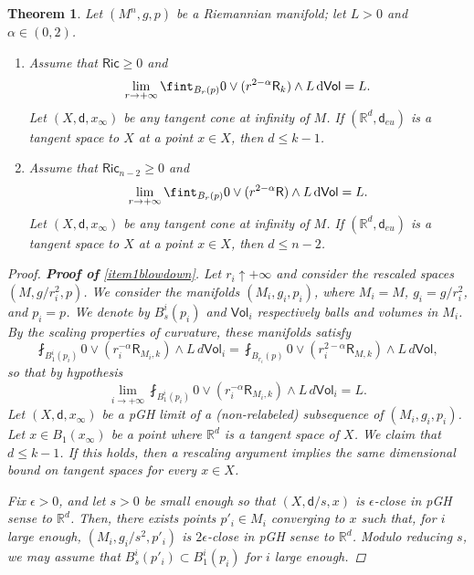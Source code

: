 \documentclass[10pt]{article}
\newtheorem{thm}{Theorem}[section]
\theoremstyle{definition}
\newcommand{\bb}[1]{\mathbb{#1}}
\newcommand{\ssf}[1]{\mathsf{#1}}
\newcommand{\Ric}{\mathsf{Ric}}
\newcommand{\sd}{\mathsf{d}}
\newcommand{\R}{\mathsf{R}}
\newcommand{\de}{{\rm d}}
\begin{document}
\begin{thm} \label{T|tangentcones}
    Let $(M^n,g,p)$ be a Riemannian manifold; let $L>0$ and $\alpha \in (0,2)$.
    \begin{enumerate}
        \item \label{item1blowdown}
        Assume that $\Ric \geq 0$ and
    \[ 
    \lim_{r \to + \infty} \fint_{B_r(p)} 0 \vee (r^{2-\alpha}\R_k) \wedge L \,\de\ssf{Vol}=L.
    \]
    Let $(X,\sd,x_\infty)$ be any tangent cone at infinity of $M$. 
    If $(\bb{R}^d,\sd_{eu})$ is a tangent space to $X$ at a point $x  \in X$, then $d \leq k-1$. 
    \item \label{item2blowdown}
    Assume that $\Ric_{n-2} \geq 0$ and
    \[
    \lim_{r \to + \infty} \fint_{B_r(p)} 0 \vee (r^{2-\alpha}\R) \wedge L \,\de\ssf{Vol}=L.
    \]
    Let $(X,\sd,x_\infty)$ be any tangent cone at infinity of $M$. 
    If $(\bb{R}^d,\sd_{eu})$ is a tangent space to $X$ at a point $x \in X$, then $d \leq n-2$.
    \end{enumerate}
    \begin{proof}
        \textbf{Proof of }\ref{item1blowdown}.
        Let $r_i \uparrow +\infty$ and consider the rescaled spaces $(M,g/r_i^2,p)$. We consider the manifolds $(M_i,g_i,p_i)$, where $M_i=M$, $g_i=g/r_i^2$, and $p_i=p$. We denote by $B_s^i(p_i)$ and $\ssf{Vol}_i$ respectively balls and volumes in $M_i$. By the scaling properties of curvature, these manifolds satisfy
        \begin{equation*}
            \fint_{B^i_1(p_i)} 0 \vee (r_i^{-\alpha}\R_{M_i,k}) \wedge L \, d\ssf{Vol}_i=
            \fint_{B_{r_i}(p)} 0 \vee (r_i^{2-\alpha}\R_{M,k}) \wedge L \, d\ssf{Vol},
        \end{equation*}
        so that by hypothesis
        \begin{equation} \label{bbb}
            \lim_{i \to + \infty}\fint_{B^i_1(p_i)} 0 \vee (r_i^{-\alpha}\R_{M_i,k})\wedge L \, d\ssf{Vol}_i=L.
        \end{equation}
        Let $(X,\sd,x_\infty)$ be a pGH limit of a (non-relabeled) subsequence of $(M_i,g_i,p_i)$.
        Let $x \in B_1(x_\infty)$ be a point where $\bb{R}^d$ is a tangent space of $X$. We claim that $d \leq k-1$. If this holds, then a rescaling argument implies the same dimensional bound on tangent spaces for every $x \in X$.
        
        Fix $\epsilon>0$, and let $s>0$ be small enough so that $(X,\sd/s,x)$ is $\epsilon$-close in pGH sense to $\bb{R}^d$. 
        Then, there exists points $p'_i \in M_i$ converging to $x$ such that, for $i$ large enough, $(M_i,g_i/s^2,p'_i)$ is $2\epsilon$-close in pGH sense to $\bb{R}^d$. 
        Modulo reducing $s$, we may assume that $B^i_s(p'_i) \subset B^i_1(p_i)$ for $i$ large enough.
        

\end{proof}
\end{thm}
\end{document}
